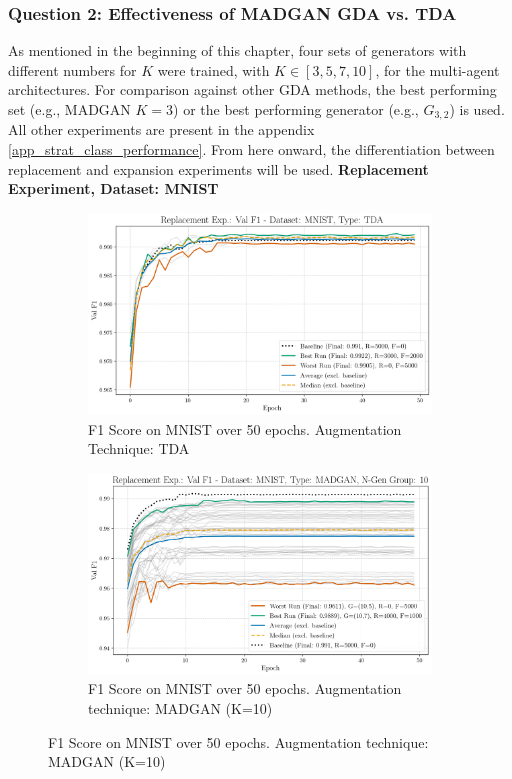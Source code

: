 \subsubsection[Question 2]{Question 2: Effectiveness of MADGAN GDA vs. TDA}\label{exp_results_ans_q2} 
 As mentioned in the beginning of this chapter, four sets of generators with different numbers for \(K\) were trained, with \(K \in [3, 5, 7, 10]\), for the multi-agent architectures. For comparison against other GDA methods, the best performing set (e.g., MADGAN \(K=3\)) or the best performing generator (e.g., \(G_{3,2}\)) is used. All other experiments are present in the appendix \ref{app_strat_class_performance}. From here onward, the differentiation between replacement and expansion experiments will be used. 
\newpage
 \noindent\textbf{Replacement Experiment, Dataset: MNIST}
\begin{figure}[H] 
	\centering
	\begin{subfigure}{.85\textwidth}
		\includegraphics[width=\textwidth]{abb/strat_classifier_performance/tda_mnist/replacement_experiments/val_f1_score_tda_mnist_mnist_all.png}
		\caption{F1 Score on MNIST over 50 epochs. Augmentation Technique: TDA} 
        \label{fig:res_replacement_mnist_tda_vs_madgan__tda}
	\end{subfigure}
	\begin{subfigure}{.85\textwidth}
		\includegraphics[width=\textwidth]{abb/strat_classifier_performance/MNIST_STRATIFIED_CLASSIFIERS_MADGAN_NEW/replacement_experiments/val_f1_score_MADGAN_MNIST_n_gen_10_all.png}
		\caption{F1 Score on MNIST over 50 epochs. Augmentation technique: MADGAN (K=10)} 
        \label{fig:res_replacement_mnist_tda_vs_madgan__madgan}
	\end{subfigure}
\end{figure}


